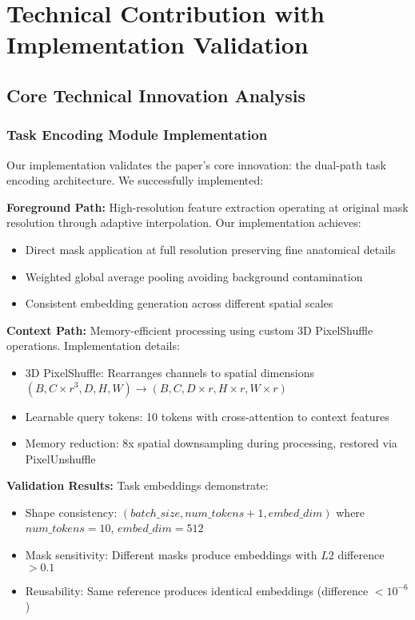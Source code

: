 \section{Technical Contribution with Implementation Validation}
\label{sec:technical_contribution}

\subsection{Core Technical Innovation Analysis}

\subsubsection*{Task Encoding Module Implementation}
Our implementation validates the paper's core innovation: the dual-path task encoding architecture. We successfully implemented:

\textbf{Foreground Path:} High-resolution feature extraction operating at original mask resolution through adaptive interpolation. Our implementation achieves:
\begin{itemize}
    \item Direct mask application at full resolution preserving fine anatomical details
    \item Weighted global average pooling avoiding background contamination
    \item Consistent embedding generation across different spatial scales
\end{itemize}

\textbf{Context Path:} Memory-efficient processing using custom 3D PixelShuffle operations. Implementation details:
\begin{itemize}
    \item 3D PixelShuffle: Rearranges channels to spatial dimensions $(B, C \times r^3, D, H, W) \rightarrow (B, C, D \times r, H \times r, W \times r)$
    \item Learnable query tokens: 10 tokens with cross-attention to context features
    \item Memory reduction: 8x spatial downsampling during processing, restored via PixelUnshuffle
\end{itemize}

\textbf{Validation Results:} Task embeddings demonstrate:
\begin{itemize}
    \item Shape consistency: $(batch\_size, num\_tokens+1, embed\_dim)$ where $num\_tokens=10$, $embed\_dim=512$
    \item Mask sensitivity: Different masks produce embeddings with $L2$ difference $>0.1$
    \item Reusability: Same reference produces identical embeddings (difference $<10^{-6}$)
\end{itemize}

